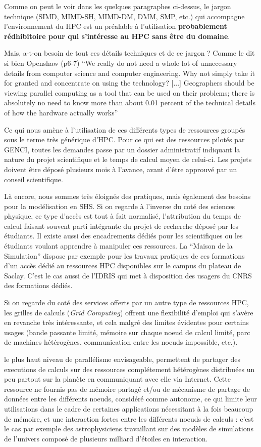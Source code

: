 Comme on peut le voir dans les quelques paragraphes ci-dessus, le jargon technique (SIMD, MIMD-SH, MIMD-DM, DMM, SMP, etc.) qui accompagne l'environnement du HPC est un préalable à l'utilisation \textbf{probablement rédhibitoire pour qui s'intéresse au HPC sans être du domaine}. 

Mais, a-t-on besoin de tout ces détails techniques et de ce jargon ? Comme le dit si bien Openshaw (p6-7) “We really do not need a whole lot of unnecessary details from computer science and computer engineering. Why not simply take it for granted and concentrate on using the technology? [...] Geographers should be viewing parallel computing as a tool that can be used on their problems; there is absolutely no need to know more than about 0.01 percent of the technical details of how the hardware actually works”

Ce qui nous amène à l'utilisation de ces différents types de ressources groupés sous le terme très générique d'HPC. Pour ce qui est des ressources pilotés par GENCI, toutes les demandes passe par un dossier administratif indiquant la nature du projet scientifique et le temps de calcul moyen de celui-ci. Les projets doivent être déposé plusieurs mois à l'avance, avant d'être approuvé par un conseil scientifique.

Là encore, nous sommes très éloignés des pratiques, mais également des besoins pour la modélisation en SHS. Si on regarde à l'inverse du coté des sciences physique, ce type d'accès est tout à fait normalisé, l'attribution du temps de calcul faisant souvent parti intégrante du projet de recherche déposé par les étudiants. Il existe aussi des encadrements dédiés pour les scientifiques ou les étudiants voulant apprendre à manipuler ces ressources. La \enquote{Maison de la Simulation} dispose par exemple pour les travaux pratiques de ces formations d'un accès dédié au ressources HPC disponibles sur le campus du plateau de Saclay. C'est le cas aussi de l'IDRIS qui met à disposition des usagers du CNRS des formations dédiés. 

Si on regarde du coté des services offerts par un autre type de ressources HPC, les grilles de calculs (\textit{Grid Computing}) offrent une flexibilité d'emploi qui s'avère en revanche très intéressante, et cela malgré des limites évidentes pour certains usages (bande passante limité, mémoire sur chaque noeud de calcul limité, parc de machines hétérogènes, communication entre les noeuds impossible, etc.).

le plus haut niveau de parallélisme envisageable, permettent de partager des executions de calculs sur des ressources complétement hétérogènes distribuées un peu partout sur la planète en communiquant avec elle via Internet. Cette ressource ne fournis pas de mémoire partagé et/ou de mécanisme de partage de données entre les différents noeuds, considéré comme autonome, ce qui limite leur utilisations dans le cadre de certaines applications nécessitant à la fois beaucoup de mémoire, et une interaction fortes entre les différents noeuds de calculs : c'est le cas par exemple des astrophysiciens travaillant sur des modèles de simulations de l'univers composé de plusieurs milliard d'étoiles en interaction.

